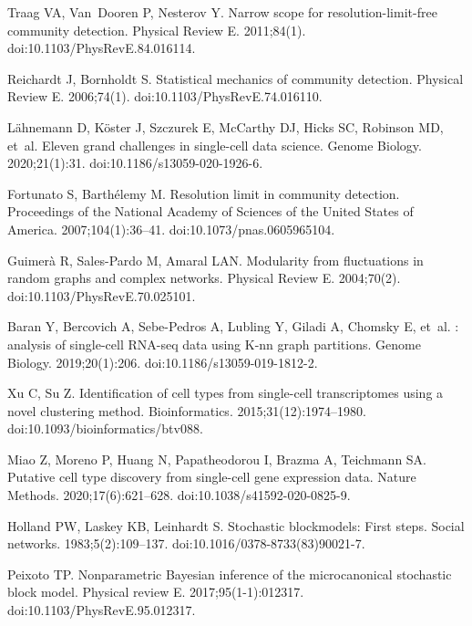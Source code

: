 \documentclass[10pt,letterpaper]{article}
\begin{document}
\begin{thebibliography}{10}
Traag VA, Van~Dooren P, Nesterov Y.
\newblock Narrow scope for resolution-limit-free community detection.
\newblock Physical Review E. 2011;84(1).
\newblock doi:{10.1103/{PhysRevE}.84.016114}.

Reichardt J, Bornholdt S.
\newblock Statistical mechanics of community detection.
\newblock Physical Review E. 2006;74(1).
\newblock doi:{10.1103/{PhysRevE}.74.016110}.

{Lähnemann} D, {Köster} J, Szczurek E, {McCarthy} DJ, Hicks SC, Robinson MD,
  et~al.
\newblock Eleven grand challenges in single-cell data science.
\newblock Genome Biology. 2020;21(1):31.
\newblock doi:{10.1186/s13059-020-1926-6}.

Fortunato S, {Barthélemy} M.
\newblock Resolution limit in community detection.
\newblock Proceedings of the National Academy of Sciences of the United States
  of America. 2007;104(1):36--41.
\newblock doi:{10.1073/pnas.0605965104}.

{Guimerà} R, Sales-Pardo M, Amaral LAN.
\newblock Modularity from fluctuations in random graphs and complex networks.
\newblock Physical Review E. 2004;70(2).
\newblock doi:{10.1103/{PhysRevE}.70.025101}.

Baran Y, Bercovich A, Sebe-Pedros A, Lubling Y, Giladi A, Chomsky E, et~al.
: analysis of single-cell {RNA}-seq data using K-nn graph
  partitions.
\newblock Genome Biology. 2019;20(1):206.
\newblock doi:{10.1186/s13059-019-1812-2}.

Xu C, Su Z.
\newblock Identification of cell types from single-cell transcriptomes using a
  novel clustering method.
\newblock Bioinformatics. 2015;31(12):1974--1980.
\newblock doi:{10.1093/bioinformatics/btv088}.

Miao Z, Moreno P, Huang N, Papatheodorou I, Brazma A, Teichmann SA.
\newblock Putative cell type discovery from single-cell gene expression data.
\newblock Nature Methods. 2020;17(6):621--628.
\newblock doi:{10.1038/s41592-020-0825-9}.

Holland PW, Laskey KB, Leinhardt S.
\newblock Stochastic blockmodels: First steps.
\newblock Social networks. 1983;5(2):109--137.
\newblock doi:{10.1016/0378-8733(83)90021-7}.

Peixoto TP.
\newblock Nonparametric Bayesian inference of the microcanonical stochastic
  block model.
\newblock Physical review E. 2017;95(1-1):012317.
\newblock doi:{10.1103/{PhysRevE}.95.012317}.


\end{thebibliography}
\end{document}
